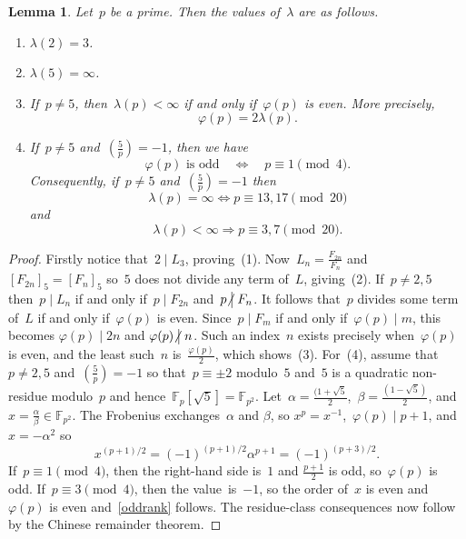 \documentclass[]{interact}
\theoremstyle{plain}
\numberwithin{equation}{section} %
\newtheorem{lemma}[thm]{Lemma}
\numberwithin{table}{section} %
\numberwithin{figure}{section}
\def\FF{\mathbb{F}}
\newcommand\notdivides{\mathrel{\kern-3pt\not\!\kern4.3pt\bigm|}}
\newcommand\divides\mid
\begin{document}
\begin{lemma}\label{lemmaTrivialLucas}
Let~$p$ be a prime. Then the values of~$\lambda$ are
as follows.
\begin{enumerate}
\item[\rm(1)] $\lambda(2)=3$.
\item[\rm(2)] $\lambda(5)=\infty$.
\item[\rm(3)] If~$p\ne5$, then~$\lambda(p)<\infty$ if and only
if~$\varphi(p)$ is even. More precisely,
\begin{equation*}\label{eq:twolambda}
 \varphi(p)=2\lambda(p).
 \end{equation*}
\item[\rm(4)] If~$p\ne5$ and~$\left(\frac5p\right)=-1$, then
we have
\begin{equation}\label{oddrank}
\varphi(p)\text{ is odd}\quad\Longleftrightarrow\quad p\equiv1\pmod4.
\end{equation}
Consequently, if~$p\neq5$ and~$\left(\frac5p\right)=-1$ then
\[
\lambda(p)=\infty
\Longleftrightarrow
p\equiv13,17\pmod{20}
\]
and
\[
\lambda(p)
<
\infty
\Longrightarrow
p\equiv3,7\pmod{20}.
\]
\end{enumerate}
\end{lemma}

\begin{proof}
Firstly notice that~$2\divides L_3$,
proving~(1).
Now~$L_n=\frac{F_{2n}}{F_{n}}$
and~$[F_{2n}]_5=[F_n]_{5}$ so~$5$
does not divide any term of~$L$,
giving~(2).
If~$p\neq2,5$ then~$p\divides L_n$ if and only
if~$p\divides F_{2n}$ and~$p\notdivides F_{n}$.
It follows that~$p$ divides some term of~$L$
if and only if~$\varphi(p)$ is even.
Since~$p\divides F_m$ if and only if~$\varphi(p)\divides m$,
this becomes $\varphi(p)\divides 2n$ and $\varphi (p)\notdivides n$.
Such an index~$n$ exists precisely when~$\varphi(p)$ is even,
and the least such~$n$ is~$\frac{\varphi(p)}{2}$,
which shows~(3).
For~(4), assume that~$p\ne2,5$ and~$\left(\frac5p\right)=-1$
so that~$p\equiv\pm 2$ modulo~$5$
and~$5$ is a quadratic non-residue modulo~$p$ and
hence~$\FF_p[\sqrt{5}]=\FF_{p^2}$.
Let~$\alpha=\frac{(1+\sqrt5}{2}$,~$\beta=\frac{(1-\sqrt5)}{2}$,
and~$x=\frac{\alpha}{\beta}\in\mathbb F_{p^2}$.
The Frobenius exchanges~$\alpha$ and $\beta$,
so $x^p=x^{-1}$,~$\varphi(p)\divides p+1$,
and~$x=-\alpha^2$ so
\[
 x^{(p+1)/2}=(-1)^{(p+1)/2}\alpha^{p+1}=(-1)^{(p+3)/2}.
\]
If~$p\equiv1\pmod4$, then the right-hand side is~$1$
and $\frac{p+1}{2}$ is odd, so~$\varphi(p)$ is odd.
If~$p\equiv3\pmod4$, then the value~is~$-1$, so the order of~$x$ is even
and~$\varphi(p)$ is even and~\eqref{oddrank}
follows.
The residue-class consequences now follow by the Chinese remainder theorem.
\end{proof}
\end{document}
